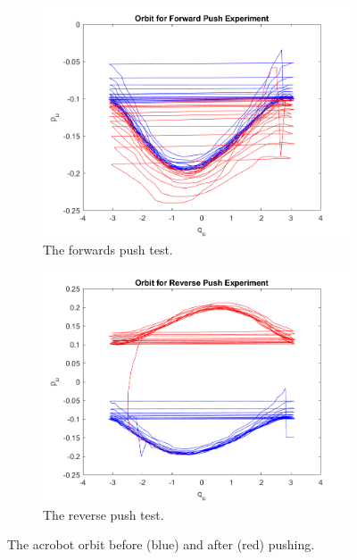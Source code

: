 \documentclass[journal,twoside,web]{ieeecolor}
\begin{document}
\begin{figure}
    \centering
    \begin{subfigure}[ht]{0.45\linewidth}
        \includegraphics[width=\linewidth]{acrobot_fpush_orbit.png}
        \caption{The forwards push test.}
        \label{fig:acrobot-fpush-orbit}
    \end{subfigure}
    \begin{subfigure}[ht]{0.45\linewidth}
        \includegraphics[width=\linewidth]{acrobot_rpush_orbit.png}
        \caption{The reverse push test.}
        \label{fig:acrobot-rpush-orbit}
    \end{subfigure}
    \caption{The acrobot orbit before (blue) and after (red) pushing.}
\end{figure}
\end{document}
